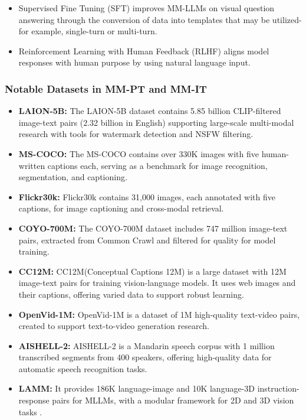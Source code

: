 \documentclass[runningheads]{llncs}
\begin{document}
\begin{itemize} 
\item Supervised Fine Tuning (SFT) improves MM-LLMs on visual question answering through the conversion of data into templates that may be utilized-for example, single-turn or multi-turn.
\item Reinforcement Learning with Human Feedback (RLHF) aligns model responses with human purpose by using natural language input.
\end{itemize}

\subsubsection{Notable Datasets in MM-PT and MM-IT}
\begin{itemize}
    \item 
\textbf{LAION-5B:} The LAION-5B\cite{ref115} dataset contains 5.85 billion CLIP-filtered image-text pairs (2.32 billion in English) supporting large-scale multi-modal research with tools for watermark detection and NSFW filtering.
    \item 
\textbf{MS-COCO:} The MS-COCO\cite{ref110} contains over 330K images with five human-written captions each, serving as a benchmark for image recognition, segmentation, and captioning.
    \item 
\textbf{Flickr30k:} Flickr30k\cite{ref105} contains 31,000 images, each annotated with five captions, for image captioning and cross-modal retrieval.
    \item 
\textbf{COYO-700M:} The COYO-700M\cite{ref139} dataset includes 747 million image-text pairs, extracted from Common Crawl and filtered for quality for model training.
    \item 
\textbf{CC12M:} CC12M(Conceptual Captions 12M)\cite{ref113} is a large dataset with 12M image-text pairs for training vision-language models. It uses web images and their captions, offering varied data to support robust  learning.
    \item 
\textbf{OpenVid-1M:} OpenVid-1M\cite{ref126} is a dataset of 1M high-quality text-video pairs, created to support text-to-video generation research.
    \item 
\textbf{AISHELL-2:} AISHELL-2 \cite{ref137} is a Mandarin speech corpus with 1 million transcribed segments from 400 speakers, offering high-quality data for automatic speech recognition tasks.
    \item 
\textbf{LAMM:} It provides 186K language-image and 10K language-3D instruction-response pairs for MLLMs, with a modular framework for 2D and 3D vision tasks \cite{ref37}.

\end{itemize}
\end{document}
